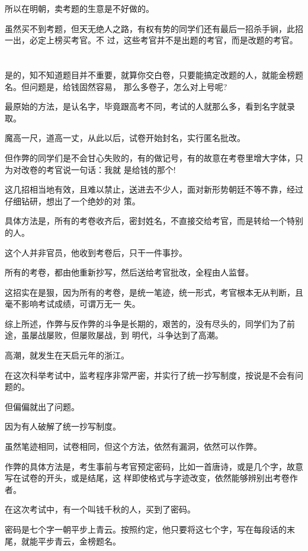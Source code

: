 \documentclass[11pt,a4paper,onecolumn]{article}
\begin{document}
所以在明朝，卖考题的生意是不好做的。

虽然买不到考题，但天无绝人之路，有权有势的同学们还有最后一招杀手锏，此招一出，必定上榜\myrule 买考官。不
过，这些考官并不是出题的考官，而是改题的考官。

\section[\thesection]{}

是的，知不知道题目并不重要，就算你交白卷，只要能搞定改题的人，就能金榜题名。但问题是，给钱固然容易，
那么多卷子，怎么对上号呢?

最原始的方法，是认名字，毕竟跟高考不同，考试的人就那么多，看到名字就录取。

魔高一尺，道高一丈，从此以后，试卷开始封名，实行匿名批改。

但作弊的同学们是不会甘心失败的，有的做记号，有的故意在考卷里增大字体，只为对改卷的考官说一句话：我就
是给钱的那个!

这几招相当地有效，且难以禁止，送进去不少人，面对新形势朝廷不等不靠，经过仔细钻研，想出了一个绝妙的对
策。

具体方法是，所有的考卷收齐后，密封姓名，不直接交给考官，而是转给一个特别的人。

这个人并非官员，他收到考卷后，只干一件事\myrule 抄。

所有的考卷，都由他重新抄写，然后送给考官批改，全程由人监督。

这招实在是狠，因为所有的考卷，是统一笔迹，统一形式，考官根本无从判断，且毫不影响考试成绩，可谓万无一
失。

综上所述，作弊与反作弊的斗争是长期的，艰苦的，没有尽头的，同学们为了前途，虽屡战屡败，但屡败屡战，到
明代，斗争达到了高潮。

高潮，就发生在天启元年的浙江。

在这次科举考试中，监考程序非常严密，并实行了统一抄写制度，按说是不会有问题的。

但偏偏就出了问题。

因为有人破解了统一抄写制度。

虽然笔迹相同，试卷相同，但这个方法，依然有漏洞，依然可以作弊。

作弊的具体方法是，考生事前与考官预定密码，比如一首唐诗，或是几个字，故意写在试卷的开头，或是结尾，这
样即使格式与字迹改变，依然能够辨别出考卷作者。

在这次考试中，有一个叫钱千秋的人，买到了密码。

密码是七个字\myrule 一朝平步上青云。按照约定，他只要将这七个字，写在每段话的末尾，就能平步青云，金榜题名。
\end{document}
